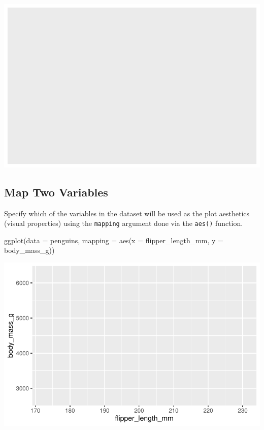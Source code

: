 \documentclass[
  letterpaper,
  DIV=11,
  numbers=noendperiod]{scrreprt}
\newenvironment{Shaded}{\begin{snugshade}}{\end{snugshade}}
\newcommand{\AttributeTok}[1]{\textcolor[rgb]{0.40,0.45,0.13}{#1}}
\newcommand{\FunctionTok}[1]{\textcolor[rgb]{0.28,0.35,0.67}{#1}}
\newcommand{\NormalTok}[1]{\textcolor[rgb]{0.00,0.23,0.31}{#1}}
\begin{document}
\includegraphics{src/r-for-data-science/01-data-viz_files/figure-pdf/unnamed-chunk-7-1.pdf}

\subsection{Map Two Variables}\label{map-two-variables}

Specify which of the variables in the dataset will be used as the plot
aesthetics (visual properties) using the \texttt{mapping} argument done
via the \texttt{aes()} function.

\begin{Shaded}
\begin{Highlighting}[]
\FunctionTok{ggplot}\NormalTok{(}\AttributeTok{data =}\NormalTok{ penguins,}
       \AttributeTok{mapping =} \FunctionTok{aes}\NormalTok{(}\AttributeTok{x =}\NormalTok{ flipper\_length\_mm, }\AttributeTok{y =}\NormalTok{ body\_mass\_g))}
\end{Highlighting}
\end{Shaded}

\includegraphics{src/r-for-data-science/01-data-viz_files/figure-pdf/unnamed-chunk-8-1.pdf}
\end{document}
